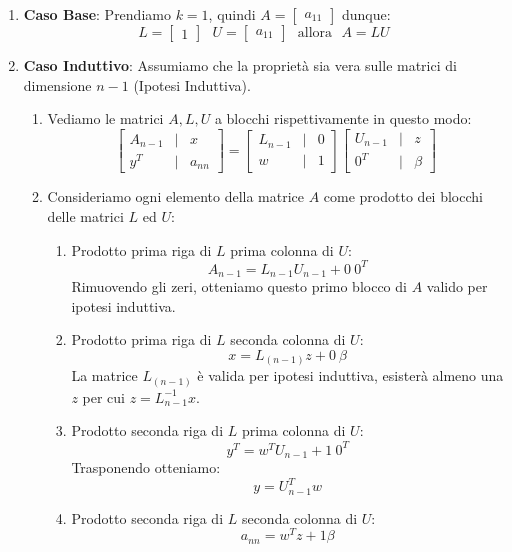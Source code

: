 \documentclass{article}
\begin{document}
\begin{enumerate}
    \item \textbf{Caso Base}: Prendiamo $k=1$, quindi $A=\begin{bmatrix}
       a_{11}
   \end{bmatrix}$ dunque:
   \[ L=\begin{bmatrix}
       1
   \end{bmatrix} \: \: \:
   U=
   \begin{bmatrix}
       a_{11}
   \end{bmatrix} \:\:\:
   \text{allora}
   \:\:\:
   A=LU\]
   \item \textbf{Caso Induttivo}: Assumiamo che la proprietà sia vera sulle matrici di dimensione $n-1$ (Ipotesi Induttiva).
   \begin{enumerate}
       \item Vediamo le matrici $A, L, U$ a blocchi rispettivamente in questo modo:
       \[ \begin{bmatrix}
           A_{n-1} & | & x\\
           \hline
           y^T & | & a_{nn}
       \end{bmatrix} =
       \begin{bmatrix}
           L_{n-1} & | & 0\\
           \hline
           w & | & 1
       \end{bmatrix}
       \begin{bmatrix}
           U_{n-1} & | & z\\
           \hline
           0^T & | & \beta
       \end{bmatrix}
       \]
       \item Consideriamo ogni elemento della matrice $A$ come prodotto dei blocchi delle matrici $L$ ed $U$:
       \begin{enumerate}
           \item Prodotto prima riga di $L$ prima colonna di $U$:
           \[ A_{n-1} = L_{n-1}U_{n-1} + 0\:0^{T}\]
           Rimuovendo gli zeri, otteniamo questo primo blocco di $A$ valido per ipotesi induttiva.
           \newpage
           \item Prodotto prima riga di $L$ seconda colonna di $U$:
           \[ x = L_{(n-1)}z + 0 \: \beta  \]
           La matrice $L_{(n-1)}$ è valida per ipotesi induttiva, esisterà almeno una $z$ per cui $z=L^{-1}_{n-1}x$.
           \item Prodotto seconda riga di $L$ prima colonna di $U$:
           \[ y^{T} = w^{T}U_{n-1} + 1\:0^{T} \]
           Trasponendo otteniamo:
           \[ y = U^{T}_{n-1}w \]
           \item Prodotto seconda riga di $L$ seconda colonna di $U$:
           \[ a_{nn} = w^{T}z + 1\beta \]
       \end{enumerate}
   \end{enumerate}
\end{enumerate}
\end{document}
